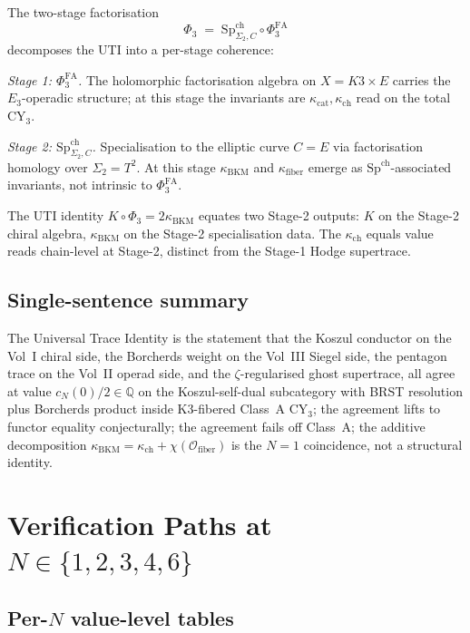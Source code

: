 \documentclass[11pt]{article}
\theoremstyle{definition}
\newcommand{\kch}{\kappa_{\mathrm{ch}}}
\newcommand{\kcat}{\kappa_{\mathrm{cat}}}
\newcommand{\kBKM}{\kappa_{\mathrm{BKM}}}
\newcommand{\kfiber}{\kappa_{\mathrm{fiber}}}
\newcommand{\SpCh}{\mathrm{Sp}^{\mathrm{ch}}}
\newcommand{\PhiFA}{\Phi^{\mathrm{FA}}}
\begin{document}
The two-stage factorisation
\[
   \Phi_3 \;=\; \SpCh_{\Sigma_2, C} \circ \PhiFA_3
\]
decomposes the UTI into a per-stage coherence:

\emph{Stage 1: $\PhiFA_3$.} The holomorphic factorisation algebra on
$X = K3 \times E$ carries the $E_3$-operadic structure; at this stage
the invariants are $\kcat, \kch$ read on the total CY$_3$.

\emph{Stage 2: $\SpCh_{\Sigma_2, C}$.} Specialisation to the elliptic
curve $C = E$ via factorisation homology over $\Sigma_2 = T^2$. At this
stage $\kBKM$ and $\kfiber$ emerge as $\SpCh$-associated invariants,
not intrinsic to $\PhiFA_3$.

The UTI identity $K \circ \Phi_3 = 2 \kBKM$ equates two Stage-2 outputs:
$K$ on the Stage-2 chiral algebra, $\kBKM$ on the Stage-2 specialisation
data. The $\kch$ equals value reads chain-level at Stage-2, distinct from
the Stage-1 Hodge supertrace.

\subsection{Single-sentence summary}

The Universal Trace Identity is the statement that the Koszul conductor
on the Vol~I chiral side, the Borcherds weight on the Vol~III Siegel side,
the pentagon trace on the Vol~II operad side, and the $\zeta$-regularised
ghost supertrace, all agree at value $c_N(0)/2 \in \mathbb{Q}$ on the
Koszul-self-dual subcategory with BRST resolution plus Borcherds product
inside K3-fibered Class~A CY$_3$; the agreement lifts to functor equality
conjecturally; the agreement fails off Class~A; the additive decomposition
$\kBKM = \kch + \chi(\mathcal{O}_{\mathrm{fiber}})$ is the $N = 1$
coincidence, not a structural identity.

\section{Verification Paths at $N \in \{1, 2, 3, 4, 6\}$}
\label{sec:verification}

\subsection{Per-$N$ value-level tables}
\end{document}
